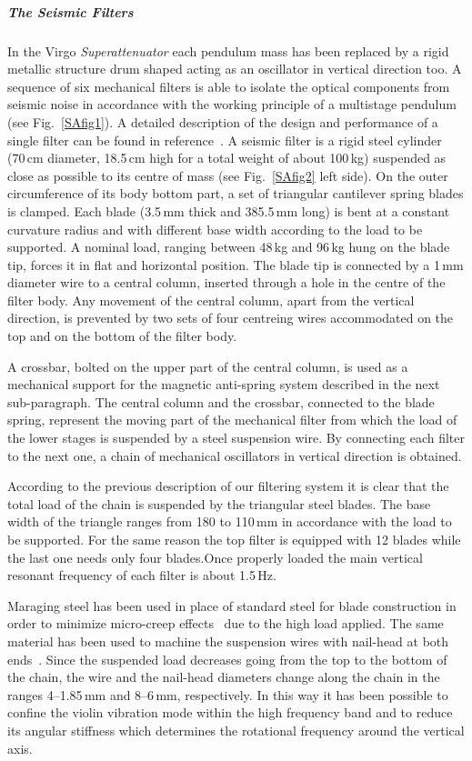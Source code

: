 \subparagraph{The Seismic Filters}
In the Virgo \emph{Superattenuator} each pendulum mass has been replaced by a rigid metallic structure drum shaped acting as an oscillator in vertical direction too. A sequence of six mechanical filters is able to isolate the optical components from seismic noise in accordance with the working principle of a multistage pendulum (see Fig.~\ref{SAfig1}). A detailed description of the design and performance of a single filter can be found in reference~\cite{Beccaria1997}. A seismic filter is a rigid steel cylinder (70\,cm diameter, 18.5\,cm high for a total weight of about 100\,kg) suspended as close as possible to its centre of mass (see Fig.~\ref{SAfig2} left side). On the outer circumference of its body bottom part, a set of triangular cantilever spring blades is clamped. Each blade (3.5\,mm thick and 385.5\,mm long) is bent at a constant curvature radius and with different base width according to the load to be supported. A nominal load, ranging between 48\,kg and 96\,kg hung on the blade tip, forces it in flat and horizontal position. The blade tip is connected by a 1\,mm diameter wire to a central column, inserted through a hole in the centre of the filter body. Any movement of the central column, apart from the vertical direction, is prevented by two sets of four centreing wires accommodated on the top and on the bottom of the filter body.

A crossbar, bolted on the upper part of the central column, is used as a mechanical support for the magnetic anti-spring system described in the next sub-paragraph. The central column and the crossbar, connected to the blade spring, represent the moving part of the mechanical filter from which the load of the lower stages is suspended by a steel suspension wire. By connecting each filter to the next one, a chain of mechanical oscillators in vertical direction is obtained.

According to the previous description of our filtering system it is clear that the total load of the chain is suspended by the triangular steel blades. The base width of the triangle ranges from 180 to 110\,mm in accordance with the load to be supported. For the same reason the top filter is equipped with 12 blades while the last one needs only four blades.Once properly loaded the main vertical resonant frequency of each filter is about 1.5\,Hz. 

Maraging steel has been used in place of standard steel for blade construction in order to minimize micro-creep effects~\cite{Beccaria1998,Braccini2000} due to the high load applied. The same material has been used to machine the suspension wires with nail-head at both ends~\cite{Delapierre1997}. Since the suspended load decreases going from the top to the bottom of the chain, the wire and the nail-head diameters change along the chain in the ranges 4--1.85\,mm and 8--6\,mm, respectively. In this way it has been possible to confine the violin vibration mode within the high frequency band and to reduce its angular stiffness which determines the rotational frequency around the vertical axis. 


